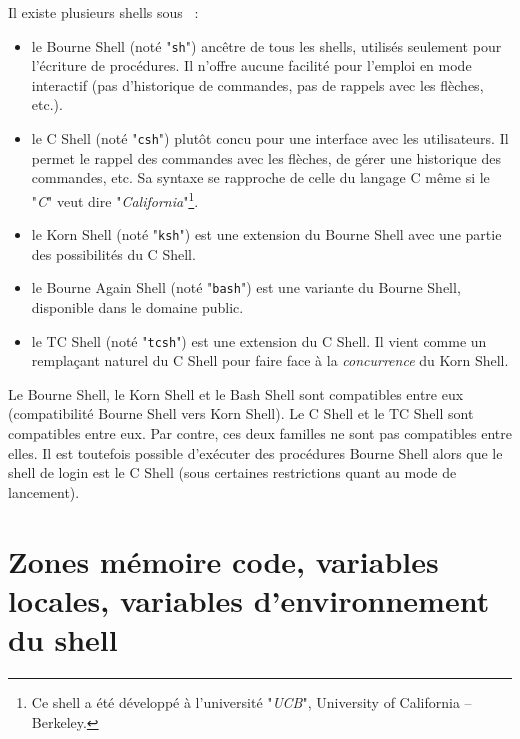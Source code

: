 Il existe plusieurs shells sous {\Unix}~:
\begin{itemize}
	\item	le Bourne Shell (not{\'e} "\texttt{sh}") anc{\^e}tre de tous les shells,
			utilis{\'e}s seulement pour l'{\'e}criture de proc{\'e}dures. Il n'offre aucune
			facilit{\'e} pour l'emploi en mode interactif (pas d'historique de
			commandes, pas de rappels avec les fl{\`e}ches, etc.).
	\item	le C Shell (not{\'e} "\texttt{csh}") plut{\^o}t concu pour une interface avec
			les utilisateurs. Il permet le rappel des commandes avec les fl{\`e}ches,
			de g{\'e}rer une historique des commandes, etc. Sa syntaxe
			se rapproche de celle du langage C m{\^e}me si le "\textsl{C}"
			veut dire "\textsl{California}"\footnote{Ce shell a {\'e}t{\'e} d{\'e}velopp{\'e} {\`a}
			l'universit{\'e} "\textsl{UCB}", University of California -- Berkeley.}.
	\item	le Korn Shell (not{\'e} "\texttt{ksh}") est une extension du Bourne Shell
			avec une partie des possibilit{\'e}s du C Shell.
	\item	le Bourne Again Shell (not{\'e} "\texttt{bash}") est une variante du Bourne Shell,
			disponible dans le domaine public.
	\item	le TC Shell (not{\'e} "\texttt{tcsh}") est une extension du C Shell. Il
			vient comme un rempla\c{c}ant naturel du C Shell pour faire face {\`a} la
			{\it concurrence} du Korn Shell.
\end{itemize}

Le Bourne Shell, le Korn Shell et le Bash Shell sont compatibles entre
eux (compatibilit{\'e} Bourne Shell vers Korn Shell). Le C Shell et le TC
Shell sont compatibles entre eux. Par contre, ces deux familles ne sont
pas compatibles entre elles. Il est toutefois possible d'ex{\'e}cuter des
proc{\'e}dures Bourne Shell alors que le shell de login est le C Shell (sous
certaines restrictions quant au mode de lancement).

\section{\label{basicn-codevar}Zones m{\'e}moire code, variables locales, variables d'environnement du shell}

